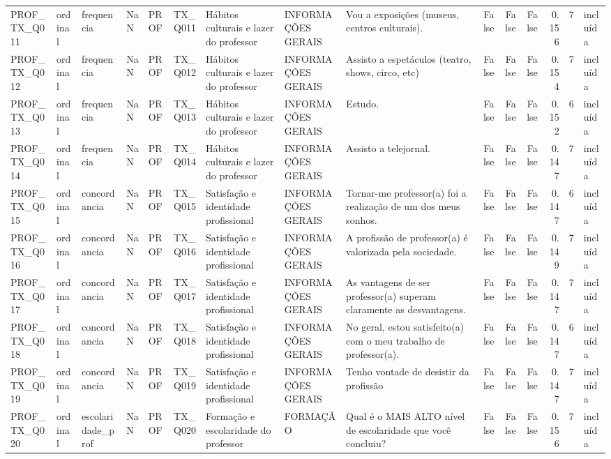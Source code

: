 \begin{tabular}{lllllllllrrrrrl}
PROF\_TX\_Q011 & ordinal & frequencia & NaN & PROF & TX\_Q011 & Hábitos culturais e lazer do professor & INFORMAÇÕES GERAIS & Vou a exposições (museus, centros culturais). & False & False & False & 0.156 & 7 & incluída \\
PROF\_TX\_Q012 & ordinal & frequencia & NaN & PROF & TX\_Q012 & Hábitos culturais e lazer do professor & INFORMAÇÕES GERAIS & Assisto a espetáculos (teatro, shows, circo, etc) & False & False & False & 0.154 & 7 & incluída \\
PROF\_TX\_Q013 & ordinal & frequencia & NaN & PROF & TX\_Q013 & Hábitos culturais e lazer do professor & INFORMAÇÕES GERAIS & Estudo. & False & False & False & 0.152 & 6 & incluída \\
PROF\_TX\_Q014 & ordinal & frequencia & NaN & PROF & TX\_Q014 & Hábitos culturais e lazer do professor & INFORMAÇÕES GERAIS & Assisto a telejornal. & False & False & False & 0.147 & 7 & incluída \\
PROF\_TX\_Q015 & ordinal & concordancia & NaN & PROF & TX\_Q015 & Satisfação e identidade profissional & INFORMAÇÕES GERAIS & Tornar-me professor(a) foi a realização de um dos meus sonhos. & False & False & False & 0.147 & 6 & incluída \\
PROF\_TX\_Q016 & ordinal & concordancia & NaN & PROF & TX\_Q016 & Satisfação e identidade profissional & INFORMAÇÕES GERAIS & A profissão de professor(a) é valorizada pela sociedade. & False & False & False & 0.149 & 7 & incluída \\
PROF\_TX\_Q017 & ordinal & concordancia & NaN & PROF & TX\_Q017 & Satisfação e identidade profissional & INFORMAÇÕES GERAIS & As vantagens de ser professor(a) superam claramente as desvantagens. & False & False & False & 0.147 & 7 & incluída \\
PROF\_TX\_Q018 & ordinal & concordancia & NaN & PROF & TX\_Q018 & Satisfação e identidade profissional & INFORMAÇÕES GERAIS & No geral, estou satisfeito(a) com o meu trabalho de professor(a). & False & False & False & 0.147 & 6 & incluída \\
PROF\_TX\_Q019 & ordinal & concordancia & NaN & PROF & TX\_Q019 & Satisfação e identidade profissional & INFORMAÇÕES GERAIS & Tenho vontade de desistir da profissão & False & False & False & 0.147 & 7 & incluída \\
PROF\_TX\_Q020 & ordinal & escolaridade\_prof & NaN & PROF & TX\_Q020 & Formação e escolaridade do professor & FORMAÇÃO & Qual é o MAIS ALTO nível de escolaridade que você concluiu? & False & False & False & 0.156 & 7 & incluída \\

\end{tabular}
